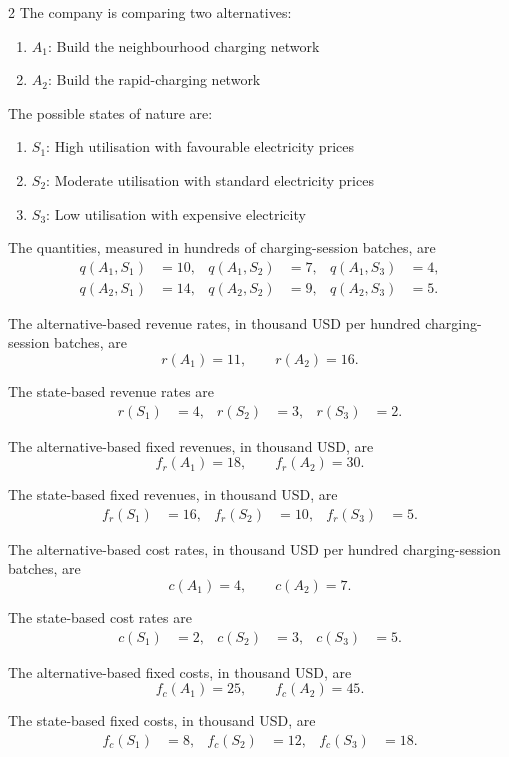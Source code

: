\begin{multicols}{2}
	The company is comparing two alternatives:
	\begin{enumerate}[label=\arabic*.]
		\item \(A_1\): Build the neighbourhood charging network
		\item \(A_2\): Build the rapid-charging network
	\end{enumerate}
	
	The possible states of nature are:
	\begin{enumerate}[label=\arabic*.]
		\item \(S_1\): High utilisation with favourable electricity prices
		\item \(S_2\): Moderate utilisation with standard electricity prices
		\item \(S_3\): Low utilisation with expensive electricity
	\end{enumerate}
	
	The quantities, measured in hundreds of charging-session batches, are
	\[
	\begin{aligned}
		q(A_1,S_1)&=10,
		&
		q(A_1,S_2)&=7,
		&
		q(A_1,S_3)&=4,
		\\
		q(A_2,S_1)&=14,
		&
		q(A_2,S_2)&=9,
		&
		q(A_2,S_3)&=5.
	\end{aligned}
	\]
	
	The alternative-based revenue rates, in thousand USD per hundred
	charging-session batches, are
	\[
	r(A_1)=11,
	\qquad
	r(A_2)=16.
	\]
	
	The state-based revenue rates are
	\[
	\begin{aligned}
		r(S_1)&=4,
		&
		r(S_2)&=3,
		&
		r(S_3)&=2.
	\end{aligned}
	\]
	
	\columnbreak
	
	The alternative-based fixed revenues, in thousand USD, are
	\[
	f_r(A_1)=18,
	\qquad
	f_r(A_2)=30.
	\]
	
	The state-based fixed revenues, in thousand USD, are
	\[
	\begin{aligned}
		f_r(S_1)&=16,
		&
		f_r(S_2)&=10,
		&
		f_r(S_3)&=5.
	\end{aligned}
	\]
	
	The alternative-based cost rates, in thousand USD per hundred
	charging-session batches, are
	\[
	c(A_1)=4,
	\qquad
	c(A_2)=7.
	\]
	
	The state-based cost rates are
	\[
	\begin{aligned}
		c(S_1)&=2,
		&
		c(S_2)&=3,
		&
		c(S_3)&=5.
	\end{aligned}
	\]
	
	The alternative-based fixed costs, in thousand USD, are
	\[
	f_c(A_1)=25,
	\qquad
	f_c(A_2)=45.
	\]
	
	The state-based fixed costs, in thousand USD, are
	\[
	\begin{aligned}
		f_c(S_1)&=8,
		&
		f_c(S_2)&=12,
		&
		f_c(S_3)&=18.
	\end{aligned}
	\]
\end{multicols}


